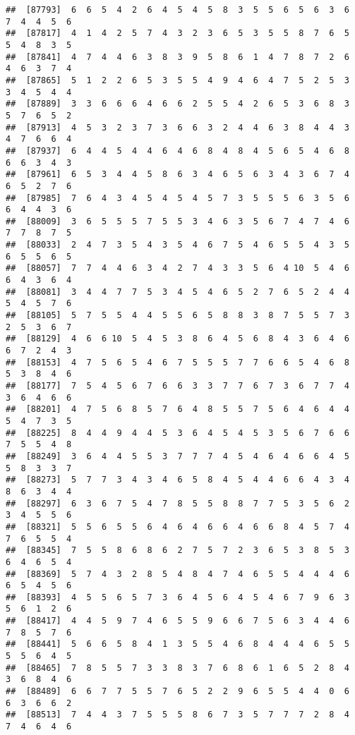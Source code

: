 \documentclass[
]{book}
\begin{document}
\begin{verbatim}
##  [87793]  6  6  5  4  2  6  4  5  4  5  8  3  5  5  6  5  6  3  6  7  4  4  5  6
##  [87817]  4  1  4  2  5  7  4  3  2  3  6  5  3  5  5  8  7  6  5  5  4  8  3  5
##  [87841]  4  7  4  4  6  3  8  3  9  5  8  6  1  4  7  8  7  2  6  4  6  3  7  4
##  [87865]  5  1  2  2  6  5  3  5  5  4  9  4  6  4  7  5  2  5  3  3  4  5  4  4
##  [87889]  3  3  6  6  6  4  6  6  2  5  5  4  2  6  5  3  6  8  3  5  7  6  5  2
##  [87913]  4  5  3  2  3  7  3  6  6  3  2  4  4  6  3  8  4  4  3  4  7  6  6  4
##  [87937]  6  4  4  5  4  4  6  4  6  8  4  8  4  5  6  5  4  6  8  6  6  3  4  3
##  [87961]  6  5  3  4  4  5  8  6  3  4  6  5  6  3  4  3  6  7  4  6  5  2  7  6
##  [87985]  7  6  4  3  4  5  4  5  4  5  7  3  5  5  5  6  3  5  6  6  4  4  3  6
##  [88009]  3  6  5  5  5  7  5  5  3  4  6  3  5  6  7  4  7  4  6  7  7  8  7  5
##  [88033]  2  4  7  3  5  4  3  5  4  6  7  5  4  6  5  5  4  3  5  6  5  5  6  5
##  [88057]  7  7  4  4  6  3  4  2  7  4  3  3  5  6  4 10  5  4  6  6  4  3  6  4
##  [88081]  3  4  4  7  7  5  3  4  5  4  6  5  2  7  6  5  2  4  4  5  4  5  7  6
##  [88105]  5  7  5  5  4  4  5  5  6  5  8  8  3  8  7  5  5  7  3  2  5  3  6  7
##  [88129]  4  6  6 10  5  4  5  3  8  6  4  5  6  8  4  3  6  4  6  6  7  2  4  3
##  [88153]  4  7  5  6  5  4  6  7  5  5  5  7  7  6  6  5  4  6  8  5  3  8  4  6
##  [88177]  7  5  4  5  6  7  6  6  3  3  7  7  6  7  3  6  7  7  4  3  6  4  6  6
##  [88201]  4  7  5  6  8  5  7  6  4  8  5  5  7  5  6  4  6  4  4  5  4  7  3  5
##  [88225]  8  4  4  9  4  4  5  3  6  4  5  4  5  3  5  6  7  6  6  7  5  5  4  8
##  [88249]  3  6  4  4  5  5  3  7  7  7  4  5  4  6  4  6  6  4  5  5  8  3  3  7
##  [88273]  5  7  7  3  4  3  4  6  5  8  4  5  4  4  6  6  4  3  4  8  6  3  4  4
##  [88297]  6  3  6  7  5  4  7  8  5  5  8  8  7  7  5  3  5  6  2  3  4  5  5  6
##  [88321]  5  5  6  5  5  6  4  6  4  6  6  4  6  6  8  4  5  7  4  7  6  5  5  4
##  [88345]  7  5  5  8  6  8  6  2  7  5  7  2  3  6  5  3  8  5  3  6  4  6  5  4
##  [88369]  5  7  4  3  2  8  5  4  8  4  7  4  6  5  5  4  4  4  6  6  5  4  5  6
##  [88393]  4  5  5  6  5  7  3  6  4  5  6  4  5  4  6  7  9  6  3  5  6  1  2  6
##  [88417]  4  4  5  9  7  4  6  5  5  9  6  6  7  5  6  3  4  4  6  7  8  5  7  6
##  [88441]  5  6  6  5  8  4  1  3  5  5  4  6  8  4  4  4  6  5  5  5  5  6  4  5
##  [88465]  7  8  5  5  7  3  3  8  3  7  6  8  6  1  6  5  2  8  4  3  6  8  4  6
##  [88489]  6  6  7  7  5  5  7  6  5  2  2  9  6  5  5  4  4  0  6  6  3  6  6  2
##  [88513]  7  4  4  3  7  5  5  5  8  6  7  3  5  7  7  7  2  8  4  7  4  6  4  6

\end{verbatim}
\end{document}

